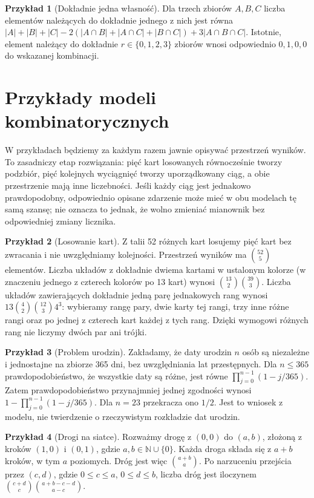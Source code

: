 \documentclass[11pt,a4paper,oneside]{report}
\numberwithin{equation}{chapter}
\theoremstyle{plain}
\theoremstyle{definition}
\newtheorem{przyklad}{Przykład}[chapter]
\theoremstyle{remark}
\newcommand{\N}{\mathbb{N}}
\begin{document}
\begin{przyklad}[Dokładnie jedna własność]
Dla trzech zbiorów $A,B,C$ liczba elementów należących do dokładnie
jednego z nich jest równa
$|A|+|B|+|C|-2(|A\cap B|+|A\cap C|+|B\cap C|)+3|A\cap B\cap C|$.
Istotnie, element należący do dokładnie $r\in\{0,1,2,3\}$ zbiorów
wnosi odpowiednio $0,1,0,0$ do wskazanej kombinacji.
\end{przyklad}

\section{Przykłady modeli kombinatorycznych}
W przykładach będziemy za każdym razem jawnie opisywać
przestrzeń wyników. To zasadniczy etap rozwiązania: pięć kart
losowanych równocześnie tworzy podzbiór, pięć kolejnych wyciągnięć
tworzy uporządkowany ciąg, a obie przestrzenie mają inne liczebności.
Jeśli każdy ciąg jest jednakowo prawdopodobny, odpowiednio opisane
zdarzenie może mieć w obu modelach tę samą szansę; nie oznacza to
jednak, że wolno zmieniać mianownik bez odpowiedniej zmiany licznika.

\begin{przyklad}[Losowanie kart]
Z talii 52 różnych kart losujemy pięć kart bez zwracania i nie
uwzględniamy kolejności. Przestrzeń wyników ma $\binom{52}5$ elementów.
Liczba układów z dokładnie dwiema kartami w ustalonym kolorze
(w znaczeniu jednego z czterech kolorów po 13 kart) wynosi
$\binom{13}2\binom{39}3$. Liczba układów zawierających dokładnie
jedną parę jednakowych rang wynosi
$13\binom42\binom{12}3 4^3$: wybieramy rangę pary,
dwie karty tej rangi, trzy inne różne rangi oraz po jednej z czterech
kart każdej z tych rang. Dzięki wymogowi różnych rang nie liczymy
dwóch par ani trójki.
\end{przyklad}

\begin{przyklad}[Problem urodzin]
Zakładamy, że daty urodzin $n$ osób są niezależne i jednostajne na
zbiorze 365 dni, bez uwzględniania lat przestępnych. Dla $n\leq365$
prawdopodobieństwo, że wszystkie daty są różne, jest równe
$\prod_{j=0}^{n-1}(1-j/365)$. Zatem prawdopodobieństwo przynajmniej
jednej zgodności wynosi
$1-\prod_{j=0}^{n-1}(1-j/365)$.
Dla $n=23$ przekracza ono $1/2$. Jest to wniosek z modelu,
nie twierdzenie o rzeczywistym rozkładzie dat urodzin.
\end{przyklad}

\begin{przyklad}[Drogi na siatce]
Rozważmy drogę z $(0,0)$ do $(a,b)$, złożoną z kroków $(1,0)$ i $(0,1)$,
gdzie $a,b\in\N\cup\{0\}$. Każda droga składa się z $a+b$ kroków,
w tym $a$ poziomych. Dróg jest więc $\binom{a+b}{a}$.
Po narzuceniu przejścia przez $(c,d)$, gdzie $0\leq c\leq a$,
$0\leq d\leq b$, liczba dróg jest iloczynem
$\binom{c+d}c\binom{a+b-c-d}{a-c}$.
\end{przyklad}
\end{document}
